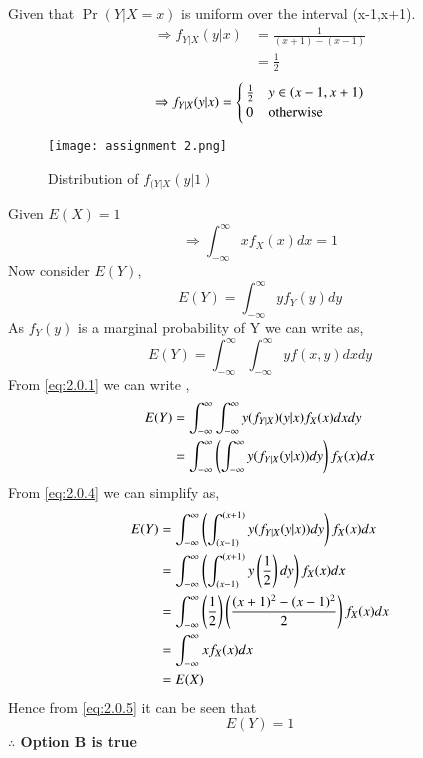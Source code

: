 \documentclass[journal,12pt,twocolumn]{IEEEtran}
\begin{document}
Given that $\Pr{(Y|X=x)}$ is uniform over the interval (x-1,x+1).
\begin{align}
    \Rightarrow f_{Y|X}(y|x) &= \frac{1}{(x+1)-(x-1)}\\
    &=\frac{1}{2}
\end{align}
\begin{equation}
    \Rightarrow f_{Y|X}(y|x)=
    \begin{cases}
    \frac{1}{2} & y \in \left(x-1,x+1\right)\\
    0 & \text{otherwise}
    \end{cases}\label{eq:2.0.4}
\end{equation}
\begin{figure}[H]
    \centering
    \texttt{[image: assignment 2.png]}
    \caption{Distribution of $f_{(Y|X}(y|1)$}
\end{figure}
Given $E(X)=1$
\begin{equation}
    \Rightarrow \int_{-\infty}^{\infty}x f_{X}(x)dx=1 \label{eq:2.0.5}
\end{equation}
Now consider $E(Y)$,
\begin{equation}
    E(Y)=\int_{-\infty}^{\infty}yf_{Y}(y)dy
\end{equation}
As $f_{Y}(y)$ is a marginal probability of Y we can write as,
\begin{equation}
    E(Y)=\int_{-\infty}^{\infty}\int_{-\infty}^{\infty}y f(x,y)dx dy
\end{equation}
From \ref{eq:2.0.1} we can write ,
\begin{align}
    E(Y)&=\int_{-\infty}^{\infty}\int_{-\infty}^{\infty}y( f_{Y|X})(y|x) f_{X}(x) dx dy\\
    &=\int_{-\infty}^{\infty}\left(\int_{-\infty}^{\infty}y (f_{Y|X}(y|x))dy\right) f_{X}(x) dx
\end{align}
From \ref{eq:2.0.4} we can simplify as,
\begin{align}
    E(Y)&=\int_{-\infty}^{\infty}\left(\int_{(x-1)}^{(x+1)}y (f_{Y|X}(y|x))dy\right) f_{X}(x) dx\\
    &=\int_{-\infty}^{\infty}\left(\int_{(x-1)}^{(x+1)}y \left(\frac{1}{2}\right) dy\right) f_{X}(x) dx\\
    &=\int_{-\infty}^{\infty} \left(\frac{1}{2}\right) \left(\frac{(x+1)^2-(x-1)^2}{2}\right)  f_{X}(x) dx\\
    &= \int_{-\infty}^{\infty}x f_{X}(x)dx\\
    &=E(X)
\end{align}
Hence from \ref{eq:2.0.5} it can be seen that 
\begin{equation}    
    E(Y)=1
\end{equation}
\textbf{$\therefore$ Option B is true}

\end{document}

